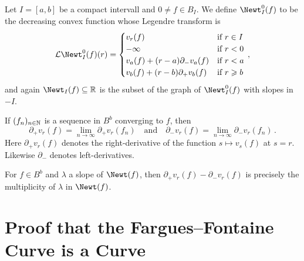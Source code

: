 \begin{defi}
	Let $I=[a,b]$ be a compact intervall and $0\neq f\in B_I$. We define $\Newt_I^0(f)$ to be the decreasing convex function whose Legendre transform is
	\begin{equation*}
		\Ll\Newt_I^0(f)(r)=\begin{cases}
		v_r(f) & \text{if }r\in I\\
		-\infty & \text{if }r<0\\
		v_a(f)+(r-a)\partial_-v_a(f) & \text{if }r<a\\
		v_b(f)+(r-b)\partial_+v_b(f) & \text{if }r\geq b
		\end{cases}\,,
	\end{equation*}
	and again $\Newt_I(f)\subseteq \IR$ is the subset of the graph of $\Newt_I^0(f)$ with slopes in $-I$.
\end{defi}
\begin{rem}
	\begin{numerate}
		\item If $(f_n)_{n\in\mathbb{N}}$ is a sequence in $B^b$ converging to $f$, then
		\begin{equation*}
			\partial_+v_r(f)=\lim_{n\to\infty}\partial_+v_r(f_n)\quad\text{and}\quad\partial_-v_r(f)=\lim_{n\to\infty}\partial_-v_r(f_n)\,.
		\end{equation*}
		Here $\partial_+v_r(f)$ denotes the right-derivative of the function $s\mapsto v_s(f)$ at $s=r$. Likewise $\partial_-$ denotes left-derivatives.
		\item For $f\in B^b$ and $\lambda$ a slope of $\Newt(f)$, then $\partial_+v_r(f)-\partial_-v_r(f)$ is precisely the multiplicity of $\lambda$ in $\Newt(f)$.
	\end{numerate}
\end{rem}
\section{Proof that the Fargues--Fontaine Curve is a Curve}
